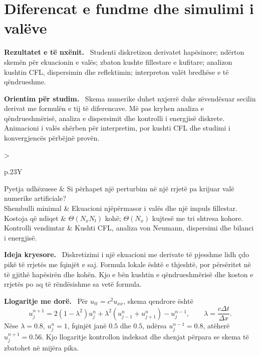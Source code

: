 \documentclass[11pt,oneside,openany]{book}
\newenvironment{qellime}{\par\medskip\noindent\textbf{Rezultatet e të nxënit.}\ }{\par\medskip}
\newenvironment{orientim}{\par\medskip\noindent\textbf{Orientim për studim.}\ }{\par\medskip}
\newenvironment{ideja}{\par\medskip\noindent\textbf{Ideja kryesore.}\ }{\par\medskip}
\newenvironment{llogaritjedore}{\par\medskip\noindent\textbf{Llogaritje me dorë.}\ }{\par\medskip}
\newcommand{\hartakapitullit}[4]{%
\par\smallskip
\noindent\begin{tabularx}{\textwidth}{>{\bfseries\raggedright\arraybackslash}p{.23\textwidth}Y}
Pyetja udhëzuese & #1\\
Shembulli minimal & #2\\
Kostoja që ndiqet & #3\\
Kontrolli vendimtar & #4
\end{tabularx}\par\medskip}
\begin{document}




\chapter{Diferencat e fundme dhe simulimi i valëve}
\begin{qellime}
Studenti diskretizon derivatet hapësinore; ndërton skemën për ekuacionin e valës; zbaton kushte fillestare e kufitare; analizon kushtin CFL, dispersimin dhe reflektimin; interpreton valët bredhëse e të qëndrueshme.
\end{qellime}

\begin{orientim}
Skema numerike duhet nxjerrë duke zëvendësuar secilin derivat me formulën e
tij të diferencave. Më pas kryhen analiza e qëndrueshmërisë, analiza e
dispersimit dhe kontrolli i energjisë diskrete. Animacioni i valës shërben për
interpretim, por kushti CFL dhe studimi i konvergjencës përbëjnë provën.
\end{orientim}

\hartakapitullit
{Si përhapet një perturbim në një rrjetë pa krijuar valë numerike artificiale?}
{Ekuacioni njëpërmasor i valës dhe një impuls fillestar.}
{$\Theta(N_xN_t)$ kohë; $\Theta(N_x)$ kujtesë me tri shtresa kohore.}
{Kushti CFL, analiza von Neumann, dispersimi dhe bilanci i energjisë.}

\begin{ideja}
Diskretizimi i një ekuacioni me derivate të pjesshme lidh çdo pikë të rrjetës
me fqinjët e saj. Formula lokale është e thjeshtë, por përsëritet në të gjithë
hapësirën dhe kohën. Kjo e bën kushtin e qëndrueshmërisë dhe koston e rrjetës
po aq të rëndësishme sa vetë formula.
\end{ideja}

\begin{llogaritjedore}
Për $u_{tt}=c^2u_{xx}$, skema qendrore është
\begin{equation}
 u_j^{n+1}=2(1-\lambda^2)u_j^n+\lambda^2(u_{j-1}^n+u_{j+1}^n)-u_j^{n-1},
 \qquad \lambda=\frac{c\Delta t}{\Delta x}.
\end{equation}
Nëse $\lambda=0.8$, $u_j^n=1$, fqinjët janë $0.5$ dhe $0.5$, ndërsa
$u_j^{n-1}=0.8$, atëherë $u_j^{n+1}=0.56$. Kjo llogaritje kontrollon indeksat
dhe shenjat përpara se skema të zbatohet në mijëra pika.
\end{llogaritjedore}
\end{document}
